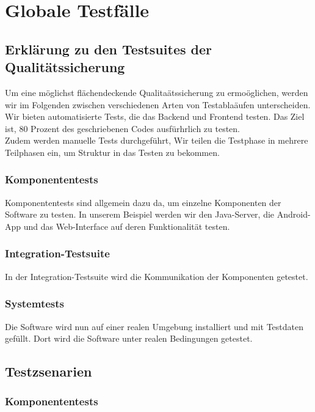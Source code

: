 \chapter{Globale Testf\"alle}
\section{Erkl\"arung zu den Testsuites der Qualit\"atssicherung}
Um eine m\"oglichst fl\"achendeckende Qualita\"atssicherung zu ermo\"oglichen, werden wir im Folgenden zwischen verschiedenen Arten von Testabla\"aufen unterscheiden. Wir bieten automatisierte Tests, die das Backend und Frontend testen. Das Ziel ist, 80 Prozent des geschriebenen Codes ausf\"urhrlich zu testen. \\
Zudem werden manuelle Tests durchgef\"uhrt, 
Wir teilen die Testphase in mehrere Teilphasen ein, um Struktur in das Testen zu bekommen.
\subsection{Komponententests}
Komponententests sind allgemein dazu da, um einzelne Komponenten der Software zu testen. In unserem Beispiel werden wir den Java-Server, die Android-App und das Web-Interface auf deren Funktionalit\"at testen. 
\subsection{Integration-Testsuite}
In der Integration-Testsuite wird die Kommunikation der Komponenten getestet.
\subsection{Systemtests}
Die Software wird nun auf einer realen Umgebung installiert und mit Testdaten gef\"ullt. Dort wird die Software unter realen Bedingungen getestet.

\section{Testzsenarien}
\subsection{Komponententests}

